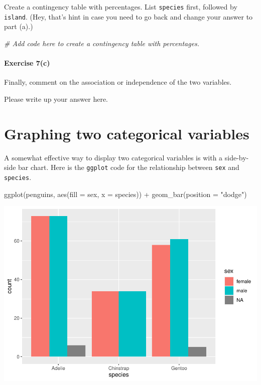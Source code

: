 \documentclass[
]{book}
\newenvironment{Shaded}{\begin{snugshade}}{\end{snugshade}}
\newcommand{\AttributeTok}[1]{\textcolor[rgb]{0.77,0.63,0.00}{#1}}
\newcommand{\CommentTok}[1]{\textcolor[rgb]{0.56,0.35,0.01}{\textit{#1}}}
\newcommand{\FunctionTok}[1]{\textcolor[rgb]{0.00,0.00,0.00}{#1}}
\newcommand{\NormalTok}[1]{#1}
\newcommand{\SpecialCharTok}[1]{\textcolor[rgb]{0.00,0.00,0.00}{#1}}
\newcommand{\StringTok}[1]{\textcolor[rgb]{0.31,0.60,0.02}{#1}}
\begin{document}
Create a contingency table with percentages. List \texttt{species} first, followed by \texttt{island}. (Hey, that's hint in case you need to go back and change your answer to part (a).)

\begin{Shaded}
\begin{Highlighting}[]
\CommentTok{\# Add code here to create a contingency table with percentages.}
\end{Highlighting}
\end{Shaded}

\hypertarget{exercise-7c}{%
\paragraph{Exercise 7(c)}\label{exercise-7c}}

Finally, comment on the association or independence of the two variables.

Please write up your answer here.

\hypertarget{categorical-graphing-two}{%
\section{Graphing two categorical variables}\label{categorical-graphing-two}}

A somewhat effective way to display two categorical variables is with a side-by-side bar chart. Here is the \texttt{ggplot} code for the relationship between \texttt{sex} and \texttt{species}.

\begin{Shaded}
\begin{Highlighting}[]
\FunctionTok{ggplot}\NormalTok{(penguins, }\FunctionTok{aes}\NormalTok{(}\AttributeTok{fill =}\NormalTok{ sex, }\AttributeTok{x =}\NormalTok{ species)) }\SpecialCharTok{+}
    \FunctionTok{geom\_bar}\NormalTok{(}\AttributeTok{position =} \StringTok{"dodge"}\NormalTok{)}
\end{Highlighting}
\end{Shaded}

\includegraphics{intro_stats_files/figure-latex/unnamed-chunk-61-1.pdf}
\end{document}
